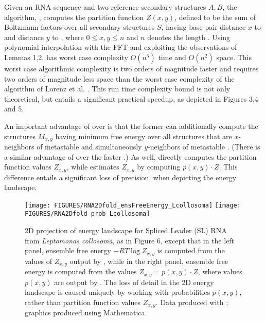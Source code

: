 Given an RNA sequence \seq and two reference secondary structures $A,B$,
the algorithm, \ffttwo, computes the partition
function $Z(x,y)$, defined to be the sum of Boltzmann factors
\boltzf{\str} over all secondary structures $S$, having base pair
distance $x$ to  \strA and distance $y$ to \strB, where
$0 \leq x,y \leq n$ and $n$ denotes the length \seq.
Using polynomial interpolation with the FFT and exploiting the observations
of Lemmas 1,2, \ffttwo has worst case complexity
$O(n^5)$ time and $O(n^2)$ space. This worst case
algorithmic complexity is two orders of magnitude faster and requires two
orders of magnitude less space than the worst case complexity of the
algorithm \rnatwofold of Lorenz et al. \citep{hofacker:RNAbor2D}.
This run time complexity bound is not only theoretical, but entails
a significant practical speedup, as depicted in
Figures 3,4 and 5.

An important advantage of
\rnatwofold over \ffttwo is that the former can additionally
compute the structures $M_{x,y}$ having minimum free energy over all
structures that are $x$-neighbors of metastable \strA and simultaneously
$y$-neighbors of metastable \strB. (There is a similar advantage of \rnabor
\citep{Freyhult.b07} over the faster \fftbor \citep{fftbor}.)
As well, \rnatwofold directly computes the partition function values
$Z_{x,y}$, while \ffttwo estimates $Z_{x,y}$ by computing
$p(x,y) \cdot Z$. This difference entails a significant loss of precision,
when depicting the energy landscape.


\begin{figure}[!t]
\begin{center}
\texttt{[image: FIGURES/RNA2Dfold\_ensFreeEnergy\_Lcollosoma]}
\hskip 1cm
\texttt{[image: FIGURES/RNA2Dfold\_prob\_Lcollosoma]}
\caption{\small
2D projection of energy landscape for Spliced Leader (SL) RNA
from {\em Leptomonas collosoma}, as in
Figure 6,
except that in the left panel, ensemble free energy $-RT \log Z_{x,y}$
is computed from the values of $Z_{x,y}$ output by \rnatwofold,
while in the right panel, ensemble free energy is computed from
the values $Z_{x,y} = p(x,y) \cdot Z$, where values $p(x,y)$ are output
by \rnatwofold.
The loss of detail in the 2D energy landscape is caused uniquely by
working with probabilities $p(x,y)$, rather than partition function
values $Z_{x,y}$.
Data produced with \rnatwofold; graphics produced using Mathematica.
}
\label{fig:heatmapRNA2Dfold}
\end{center}
\end{figure}

